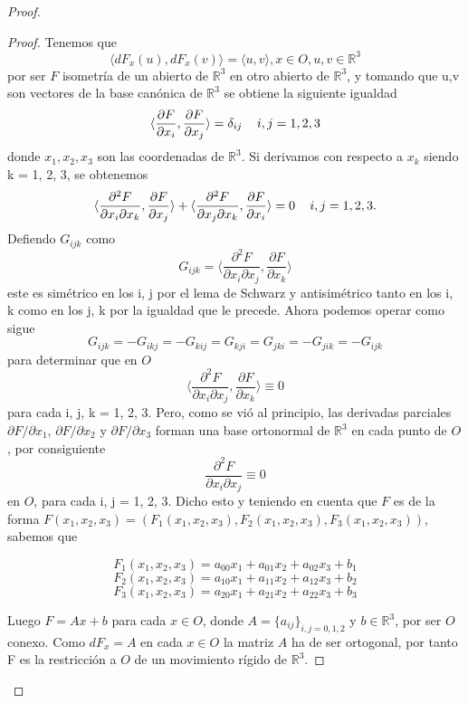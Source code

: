 \begin{proof}
	\begin{proof}
		Tenemos que
		\[
		\langle dF_x(u), dF_x(v) \rangle = \langle u, v \rangle , x \in O, u,v \in \mathbb{R}^3
		\]
		por ser $F$ isometría de un abierto de $\mathbb{R}^3$ en otro abierto de $\mathbb{R}^3$, y tomando que u,v son vectores de la base canónica de $\mathbb{R}^3$ se obtiene la siguiente igualdad
		\[
		\langle \frac{\partial F}{\partial x_i}, \frac{\partial F}{\partial x_j} \rangle = \delta_{ij} \thinspace \thinspace \thinspace \thinspace \thinspace \thinspace \thinspace i,j = 1,2,3
		\]
 		donde $x_1, x_2, x_3$ son las coordenadas de $\mathbb{R}^3$. Si derivamos con respecto a $x_k$ siendo k = 1, 2, 3, se obtenemos
		\[
		\langle\frac{\partial^2 F}{\partial x_i \partial x_k}, \frac{\partial F}{\partial x_j} \rangle + \langle \frac{\partial^2 F}{\partial x_j \partial x_k}, \frac{\partial F}{\partial x_i} \rangle = 0 \thinspace \thinspace \thinspace \thinspace \thinspace \thinspace \thinspace i,j = 1,2,3.
		\]
		Defiendo $G_{ijk}$ como
		\[
		G_{ijk} = \langle \frac{\partial^2 F}{\partial x_i \partial x_j}, \frac{\partial F}{\partial x_k} \rangle
		\]
		este es simétrico en los i, j por el lema de Schwarz y antisimétrico tanto en los i, k como en los j, k por la igualdad que le precede. Ahora podemos operar como sigue
		\[
		G_{ijk} = -G_{ikj} = -G_{kij} = G_{kji} = G_{jki} = -G_{jik} = -G_{ijk}
		\]
		para determinar que en $O$
		\[
		\langle \frac{\partial^2 F}{\partial x_i \partial x_j}, \frac{\partial F}{\partial x_k} \rangle \equiv 0
		\]
		para cada i, j, k = 1, 2, 3. Pero, como se vió al principio, las derivadas parciales $\partial F / \partial x_1$, $\partial F / \partial x_2$ y $\partial F / \partial x_3$ forman una base ortonormal de $\mathbb{R}^3$ en cada punto de $O$, por consiguiente
		\[
		\frac{\partial^2 F}{\partial x_i \partial x_j} \equiv 0
		\] en $O$, para cada  i, j = 1, 2, 3. Dicho esto y teniendo en cuenta  que $F$ es de la forma $F(x_1, x_2, x_3) = (F_1(x_1, x_2, x_3), F_2(x_1, x_2, x_3), F_3(x_1, x_2, x_3))$, sabemos que
		
		\[
		F_1(x_1, x_2, x_3) = a_{00}x_1 + a_{01}x_2 + a_{02}x_3 + b_1
		\]
		\[
		F_2(x_1, x_2, x_3) = a_{10}x_1 + a_{11}x_2 + a_{12}x_3 + b_2
		\]
		\[
		F_3(x_1, x_2, x_3) = a_{20}x_1 + a_{21}x_2 + a_{22}x_3 + b_3
		\]
		
		${ }$\\	
		
		Luego $F = Ax + b$ para cada $x \in O$, donde $A = \{a_{ij}\}_{i,j=0,1,2}$ y $b \in \mathbb{R}^3$, por ser $O$ conexo. Como $dF_x=A$ en cada $x \in O$ la matriz $A$ ha de ser ortogonal, por tanto F es la restricción a $O$ de un movimiento rígido de $\mathbb{R}^3$.
		
	\end{proof}
	
\end{proof}




